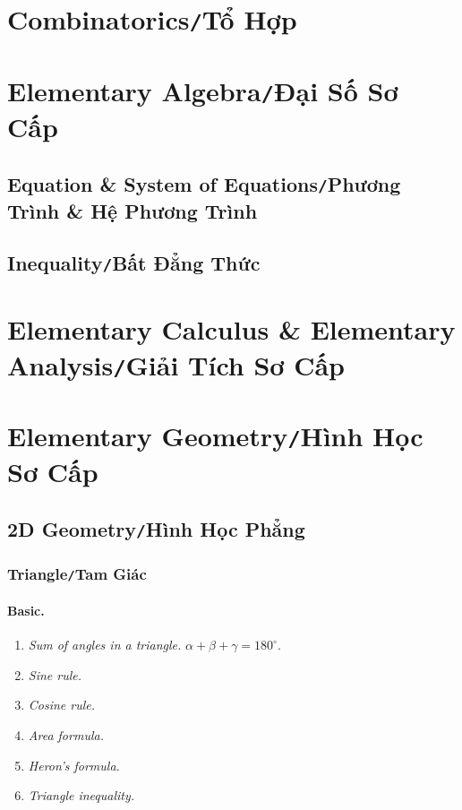 \documentclass{article}
\numberwithin{equation}{section}
\begin{document}
\section{Combinatorics\texttt{/}Tổ Hợp}

\section{Elementary Algebra\texttt{/}Đại Số Sơ Cấp}

\subsection{Equation \& System of Equations\texttt{/}Phương Trình \& Hệ Phương Trình}

\subsection{Inequality\texttt{/}Bất Đẳng Thức}

\section{Elementary Calculus \& Elementary Analysis\texttt{/}Giải Tích Sơ Cấp}

\section{Elementary Geometry\texttt{/}Hình Học Sơ Cấp}

\subsection{2D Geometry\texttt{/}Hình Học Phẳng}

\subsubsection{Triangle\texttt{/}Tam Giác}

\paragraph{Basic.}
\begin{enumerate}
	\item \textit{Sum of angles in a triangle.} $\alpha + \beta + \gamma = 180^\circ$.
	\item \textit{Sine rule.}
	\item \textit{Cosine rule.}
	\item \textit{Area formula.}
	\item \textit{Heron's formula.}
	\item \textit{Triangle inequality.}
\end{enumerate}
\end{document}
